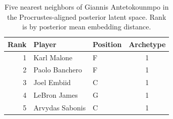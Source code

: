 \begin{table}[htbp]
  \centering\small
  \begin{tabular}{rllc}
    \toprule
    Rank & Player & Position & Archetype \\
    \midrule
    1 & Karl Malone & F & 1 \\
    2 & Paolo Banchero & F & 1 \\
    3 & Joel Embiid & C & 1 \\
    4 & LeBron James & G & 1 \\
    5 & Arvydas Sabonis & C & 1 \\
    \bottomrule
  \end{tabular}
  \caption{Five nearest neighbors of Giannis Antetokounmpo in the Procrustes-aligned posterior latent space. Rank is by posterior mean embedding distance.}
  \label{tab:Giannis_Antetokounmpo_neighbors}
\end{table}

